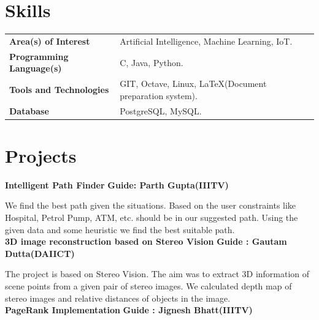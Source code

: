 \documentclass{article}
\begin{document}
\vspace*{.4cm}
\section{Skills}
\vspace*{2mm}
\begin{tabular}{ll}
\textbf{Area(s) of Interest} & Artificial Intelligence, Machine Learning, IoT.\\
\textbf{Programming Language(s)}&C, Java, Python.\\
\textbf{Tools and Technologies} & GIT, Octave, Linux, \LaTeX(Document preparation system).\\
\textbf{Database} & PostgreSQL, MySQL.\\
\end{tabular}

\vspace*{.5cm}
\section{Projects}
\vspace*{2mm}
\textbf{\large{Intelligent Path Finder}} \hspace*{9cm} \textbf{Guide: Parth Gupta(IIITV)}

\vspace*{.031mm}
\hspace*{2.6mm}
We find the best path given the situations. Based on the user constraints like Hospital, Petrol Pump, ATM, etc. should be in our suggested path. Using the given data and some heuristic we find the best suitable path.\\

\vspace*{2mm}
\textbf{\large{3D image reconstruction based on Stereo Vision}} \hspace*{3.1cm} \textbf{Guide : Gautam Dutta(DAIICT)}

\vspace*{.031mm}
\hspace*{2.6mm} The project is based on Stereo Vision. The aim was to extract 3D information of scene points from a given pair of stereo images. We calculated depth map of stereo images and relative distances of objects in the image.\\

\vspace*{2mm}
\textbf{\large{PageRank Implementation}} \hspace*{7.8cm} \textbf{Guide : Jignesh Bhatt(IIITV)}
\end{document}
